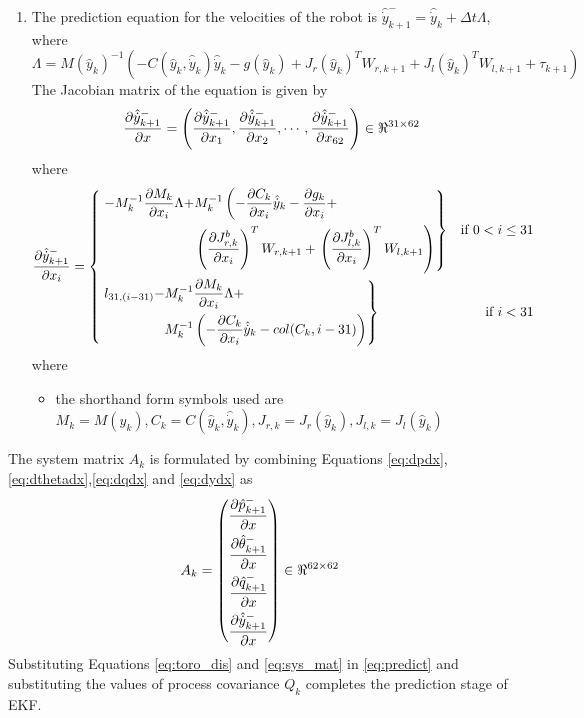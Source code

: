 \begin{enumerate}
\item The prediction equation for the velocities of the robot is $\hat{\dot{y}}_{k+1}^- = \hat{\dot{y}}_{k}+ \Delta t \Lambda $, where 
$$\Lambda = M(\hat{y}_{k})^{-1}(-C(\hat{y}_{k},\hat{\dot{y}}_{k})\hat{\dot{y}}_{k} - g(\hat{y}_{k}) + J_r(\hat{y}_{k})^{T}W_{r,k+1} +J_l(\hat{y}_{k})^{T}W_{l,k+1} + \tau_{k+1})$$
The Jacobian matrix of the equation is given by
 \begin{equation}
 \label{eq:dydx}
\frac{\partial {\hat{\dot{y}}_{k+1}^-}}{\partial {x}} = \left(\frac{\partial {\hat{\dot{y}}_{k+1}^-}}{\partial {x_{1}}}, \frac{\partial {\hat{\dot{y}}_{k+1}^-}}{\partial {x_{2}}}, \cdots , \frac{\partial {\hat{\dot{y}}_{k+1}^-}}{\partial {x_{62}}}\right) \in \Re^{31 \times 62}
\end{equation}
where
\[
\frac{\partial {\hat{\dot{y}}_{k+1}^-}}{\partial {x_{i}}} = 
\left\{ 
\!\begin{aligned}
	& \left. \!\begin{aligned}
	-M_k^{-1}\frac{\partial {M_k}}{\partial {x_{i}}}\Lambda + &M_k^{-1}\left(-\frac{\partial {C_k}}{\partial {x_{i}}}\hat{\dot{y}}_{k} -\frac{\partial {g_k}}{\partial {x_{i}}}+ \right. \\
	&\left(\frac{\partial {J_{r,k}^{b}}}{\partial {x_{i}}}\right)^{T}W_{r,k+1} + \left. \left(\frac{\partial {J_{l,k}^{b}}}{\partial {x_{i}}}\right)^{T}W_{l,k+1} \right)
	\end{aligned} \right\}& \text{if } 0 < i \leq 31 \\
    & \left.\!\begin{aligned}
    l_{31,(i-31)}-&M_k^{-1}\frac{\partial {M_k}}{\partial {x_{i}}}\Lambda+ \\
    &M_k^{-1}\left(-\frac{\partial {C_k}}{\partial {x_{i}}}\hat{\dot{y}}_{k}- col(C_k,i-31)\right)     
    \end{aligned} \right\} & \text{if } i < 31  \\
\end{aligned}
\right.
\]where
\begin{itemize}
\item the shorthand form symbols used are  $M_k= M(\hat{y}_{k}),C_k=C(\hat{y}_{k},\hat{\dot{y}}_k),J_{r,k}=J_r(\hat{y}_{k}),J_{l,k}=J_l(\hat{y}_{k})$
\end{itemize}
\end{enumerate}
The system matrix $A_k$ is formulated by combining Equations \ref{eq:dpdx},\ref{eq:dthetadx},\ref{eq:dqdx} and \ref{eq:dydx} as
\begin{equation}
\label{eq:sys_mat}
A_k = \left(
\begin{aligned}
\frac{\partial {\hat{p}_{k+1}^-}}{\partial {x}} \\
\frac{\partial {\hat{\theta}_{k+1}^-}}{\partial {x}} \\
\frac{\partial {\hat{q}_{k+1}^-}}{\partial {x}}\\
\frac{\partial {\hat{\dot{y}}_{k+1}^-}}{\partial {x}}
\end{aligned} \right)
\in \Re^{62 \times 62}
\end{equation}
Substituting Equations \ref{eq:toro_dis} and \ref{eq:sys_mat} in \ref{eq:predict} and substituting the values of process covariance $Q_k$ completes the prediction stage of EKF.



